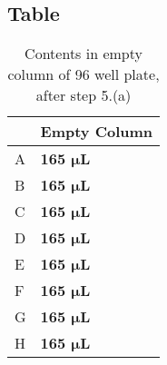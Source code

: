\documentclass[12pt, letterpaper]{article}
\begin{document}
\subsection{Table}
\begin{table}[h]
    \begin{center}
        \begin{tabular}{|l|l|}
            \hline
              & Empty Column \\ \hline
            A & \textbf{165 $\bm{\mu}$L} \\ \hline
            B & \textbf{165 $\bm{\mu}$L} \\ \hline
            C & \textbf{165 $\bm{\mu}$L} \\ \hline
            D & \textbf{165 $\bm{\mu}$L} \\ \hline
            E & \textbf{165 $\bm{\mu}$L} \\ \hline
            F & \textbf{165 $\bm{\mu}$L} \\ \hline
            G & \textbf{165 $\bm{\mu}$L} \\ \hline
            H & \textbf{165 $\bm{\mu}$L} \\ \hline
        \end{tabular}
    \caption{Contents in empty column of 96 well plate, after step 5.(a)}
    \end{center}
\end{table}
\end{document}
